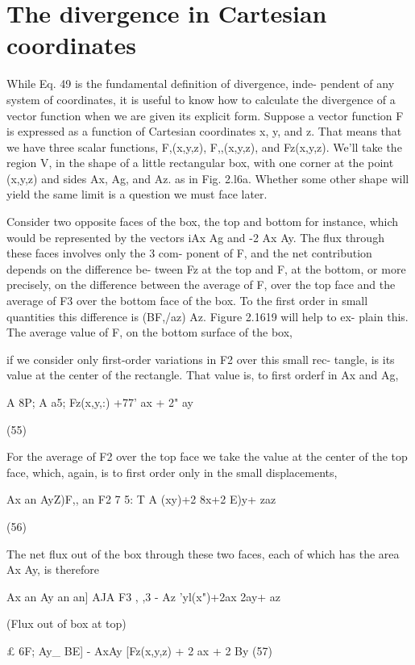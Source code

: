 \section{The divergence in Cartesian coordinates}

While Eq. 49 is the fundamental definition of divergence, inde-
pendent of any system of coordinates, it is useful to know how to
calculate the divergence of a vector function when we are given its
explicit form. Suppose a vector function F is expressed as a function
of Cartesian coordinates x, y, and z. That means that we have three
scalar functions, F,(x,y,z), F,,(x,y,z), and Fz(x,y,z). We'll take the
region V, in the shape of a little rectangular box, with one corner at
the point (x,y,z) and sides Ax, Ag, and Az. as in Fig. 2.l6a. Whether
some other shape will yield the same limit is a question we must face
later.

Consider two opposite faces of the box, the top and bottom for
instance, which would be represented by the vectors iAx Ag and
-2 Ax Ay. The flux through these faces involves only the 3 com-
ponent of F, and the net contribution depends on the difference be-
tween Fz at the top and F, at the bottom, or more precisely, on the
difference between the average of F, over the top face and the average
of F3 over the bottom face of the box. To the first order in small
quantities this difference is (BF,/az) Az. Figure 2.1619 will help to ex-
plain this. The average value of F, on the bottom surface of the box,

if we consider only first-order variations in F2 over this small rec-
tangle, is its value at the center of the rectangle. That value is, to
first orderf in Ax and Ag,

A 8P; A a5;
Fz(x,y,:) +77' ax + 2" ay

(55)

For the average of F2 over the top face we take the value at the
center of the top face, which, again, is to first order only in the small
displacements,

Ax an AyZ)F,, an
F2 7 5: T A
(xy)+2 8x+2 E)y+ zaz

(56)

The net flux out of the box through these two faces, each of which has
the area Ax Ay, is therefore

Ax an Ay an an]
AJA F3 , ,3 - Az
'yl(x")+2ax 2ay+ az

 
(Flux out of box at top)

£ 6F; Ay_ BE]
- AxAy [Fz(x,y,z) + 2 ax + 2 By (57)

